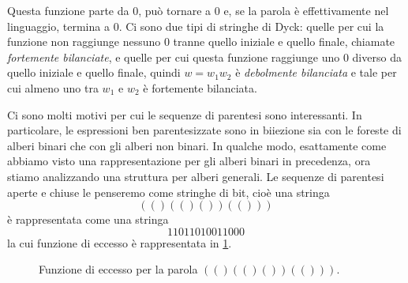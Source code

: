 Questa funzione parte da $0$, può tornare a $0$ e, se la parola è effettivamente nel
linguaggio, termina a $0$. Ci sono due tipi di stringhe di Dyck: quelle per cui
la funzione non raggiunge nessuno $0$ tranne quello iniziale e quello finale,
chiamate \textit{fortemente bilanciate}, e quelle per cui questa funzione raggiunge
uno $0$ diverso da quello iniziale e quello finale, quindi $w = w_1w_2$ è
\textit{debolmente bilanciata} e tale per cui almeno uno tra $w_1$ e $w_2$ è
fortemente bilanciata.

Ci sono molti motivi per cui le sequenze di parentesi sono interessanti. In particolare,
le espressioni ben parentesizzate sono in biiezione sia con le foreste di alberi binari che con gli
alberi non binari. In qualche modo, esattamente come abbiamo visto una rappresentazione
per gli alberi binari in precedenza, ora stiamo analizzando una struttura per alberi
generali. Le sequenze di parentesi aperte e chiuse le penseremo come stringhe di bit, cioè
una stringa
$$
	(()(()())(()))
$$
è rappresentata come una stringa
$$
	11011010011000
$$
la cui funzione di eccesso è rappresentata in \cref{fig:func_excess_example}.

\begin{figure}[h]
	\centering
	\caption{Funzione di eccesso per la parola $(()(()())(()))$.}
	\label{fig:func_excess_example}
\end{figure}

